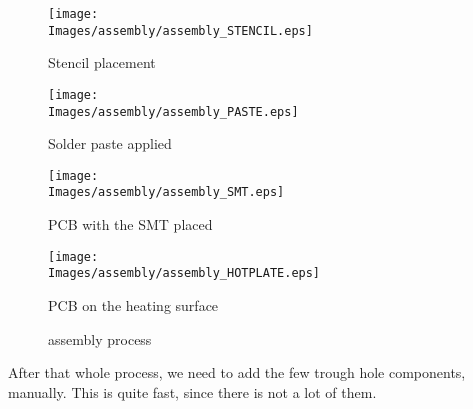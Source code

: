 \begin{figure}[!hbt]
    \centering
    \begin{minipage}[c]{\SmallSchematicWidth}
        \centering
        \texttt{[image: \\Images/assembly/assembly\_STENCIL.eps]}
        \caption*{Stencil placement}
    \end{minipage}%
    \hfill%
    \begin{minipage}[c]{\SmallSchematicWidth}
        \centering
        \texttt{[image: \\Images/assembly/assembly\_PASTE.eps]}
        \caption*{Solder paste applied}
    \end{minipage}%
    \hfill%
    \begin{minipage}[c]{\SmallSchematicWidth}
        \centering
        \texttt{[image: \\Images/assembly/assembly\_SMT.eps]}
        \caption*{PCB with the SMT placed}
    \end{minipage}%
    \hfill%
    \begin{minipage}[c]{\SmallSchematicWidth}
        \centering
        \texttt{[image: \\Images/assembly/assembly\_HOTPLATE.eps]}
        \caption*{PCB on the heating surface}
    \end{minipage}
    \label{img:assembly}
    \caption{assembly process}
\end{figure}
\FloatBarrier

After that whole process, we need to add the few trough hole components,
manually. This is quite fast, since there is not a lot of them.